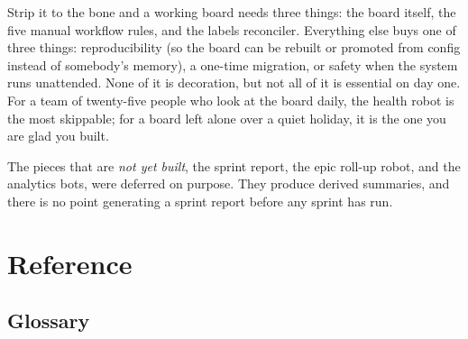 \documentclass[11pt,a4paper]{report}
\begin{document}
\begin{plainenglish}
Strip it to the bone and a working board needs three things: the board itself, the
five manual workflow rules, and the labels reconciler. Everything else buys one of
three things: reproducibility (so the board can be rebuilt or promoted from config
instead of somebody's memory), a one-time migration, or safety when the system runs
unattended. None of it is decoration, but not all of it is essential on day one. For
a team of twenty-five people who look at the board daily, the health robot is the
most skippable; for a board left alone over a quiet holiday, it is the one you are
glad you built.
\end{plainenglish}

The pieces that are \emph{not yet built}, the sprint report, the epic roll-up robot,
and the analytics bots, were deferred on purpose. They produce derived summaries,
and there is no point generating a sprint report before any sprint has run.

\part{Reference}

\chapter{Glossary}
\end{document}
